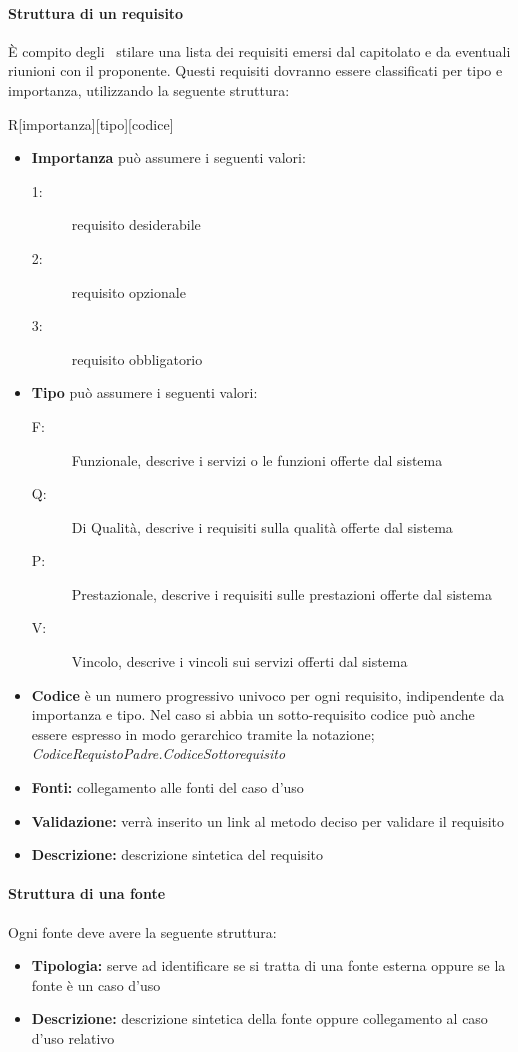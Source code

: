 \documentclass[12pt,a4paper]{article}
\begin{document}
\paragraph{Struttura di un requisito}
È compito degli \ANpl\ stilare una lista dei requisiti emersi dal capitolato e da eventuali riunioni con il proponente. Questi requisiti dovranno essere classificati per tipo e importanza, utilizzando la seguente struttura:
\begin{center}
	R[importanza][tipo][codice]
\end{center}
\begin{itemize}
	\item \textbf{Importanza} può assumere i seguenti valori:
	\begin{description}
		\item[1:] requisito desiderabile
		\item[2:] requisito opzionale
		\item[3:] requisito obbligatorio
	\end{description}
	\item \textbf{Tipo} può assumere i seguenti valori:
	\begin{description}
		\item[F:] Funzionale, descrive i servizi o le funzioni offerte dal sistema
		\item[Q:] Di Qualità, descrive i requisiti sulla qualità offerte dal sistema
		\item[P:] Prestazionale, descrive i requisiti sulle prestazioni offerte dal sistema
		\item[V:] Vincolo, descrive i vincoli sui servizi offerti dal sistema
	\end{description}
	\item \textbf{Codice} è un numero progressivo univoco per ogni requisito, indipendente da importanza e tipo. Nel caso si abbia un sotto-requisito codice può anche essere espresso in modo gerarchico tramite la notazione; \textit{CodiceRequistoPadre.CodiceSottorequisito}
	\item \textbf{Fonti:} collegamento alle fonti del caso d'uso
	\item \textbf{Validazione:} verrà inserito un link al metodo deciso per validare il requisito
	\item \textbf{Descrizione:} descrizione sintetica del requisito
\end{itemize}

\paragraph{Struttura di una fonte}
Ogni fonte deve avere la seguente struttura:
\begin{itemize}
	\item \textbf{Tipologia:} serve ad identificare se si tratta di una fonte esterna oppure se la fonte è un caso d'uso
	\item \textbf{Descrizione:} descrizione sintetica della fonte oppure collegamento al caso d'uso relativo
\end{itemize}
\end{document}
